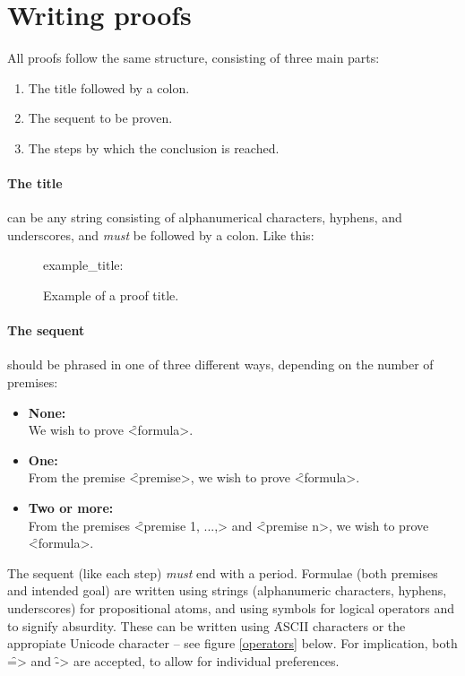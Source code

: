 \documentclass[manual.tex]{subfiles}
\begin{document}
\section{Writing proofs}

All proofs follow the same structure, consisting of three main parts:
\begin{enumerate}
\item The title followed by a colon.
\item The sequent to be proven.
\item The steps by which the conclusion is reached.
\end{enumerate}

\paragraph{The title} can be any string consisting of alphanumerical 
characters, hyphens, and underscores, and \emph{must} be followed by
a colon. Like this:
\begin{figure}[!hb]
example\_title:
\caption{Example of a proof title.}
\label{ex:title}
\end{figure}

\paragraph{The sequent} should be phrased in one of three different ways, 
 depending on the number of premises:

\begin{itemize}
\item {\bf None:}\\ We wish to prove \f{<formula>}.
\item {\bf One:}\\ From the premise \f{<premise>}, we wish to prove 
    \f{<formula>}.
\item {\bf Two or more:}\\ From the premises \f{<premise 1, ...,>} and 
    \f{<premise n>}, we wish to prove \f{<formula>}.
\end{itemize}
The sequent (like each step) \emph{must} end with a period. Formulae (both
premises and intended goal) are written using strings (alphanumeric 
characters, hyphens, underscores) for propositional atoms, and using
symbols for logical operators and to signify absurdity. 
These can be written using
 \f{ASCII} characters or the appropiate Unicode character -- see figure
 \ref{operators} below. 
 For implication, both \f{=>} and \f{->} are accepted,
 to allow for individual preferences. 
 
\end{document}
